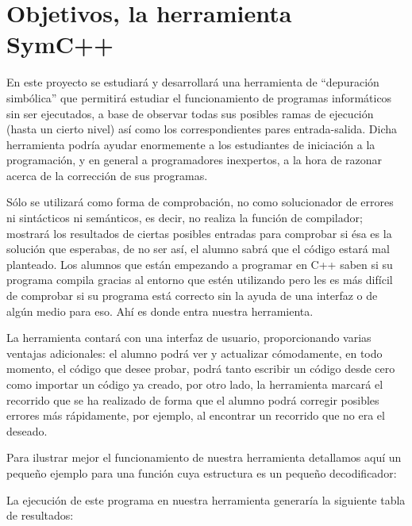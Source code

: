 \section{Objetivos, la herramienta SymC++}
\label{cap1:sec:objetivos}

En este proyecto se estudiar\'a y desarrollar\'a una herramienta de ``depuraci\'on simb\'olica'' que permitir\'a estudiar el funcionamiento de programas inform\'aticos sin ser ejecutados, a base de observar todas sus posibles ramas de ejecuci\'on (hasta un cierto nivel) as\'i como los correspondientes pares entrada-salida. Dicha herramienta podr\'ia ayudar enormemente a los estudiantes de iniciaci\'on a la programaci\'on, y en general a programadores inexpertos, a la hora de razonar acerca de la correcci\'on de sus programas.

S\'olo se utilizar\'a como forma de comprobaci\'on, no como solucionador de errores ni sint\'acticos ni sem\'anticos, es decir, no realiza la funci\'on de compilador; mostrar\'a los resultados de ciertas posibles entradas para comprobar si \'esa es la soluci\'on que esperabas, de no ser as\'i, el alumno sabr\'a que el c\'odigo estar\'a mal planteado. Los alumnos que est\'an empezando a programar en C++ saben si su programa compila gracias al entorno que est\'en utilizando pero les es m\'as dif\'icil de comprobar si su programa est\'a correcto sin la ayuda de una interfaz o de alg\'un medio para eso. Ah\'i es donde entra nuestra herramienta.

La herramienta contar\'a con una interfaz de usuario, proporcionando varias ventajas adicionales: el alumno podr\'a ver y actualizar c\'omodamente, en todo momento, el c\'odigo que desee probar, podr\'a tanto escribir un c\'odigo desde cero como importar un c\'odigo ya creado, por otro lado, la herramienta marcar\'a el recorrido que se ha realizado de forma que el alumno podr\'a corregir posibles errores m\'as r\'apidamente, por ejemplo, al encontrar un recorrido que no era el deseado.

Para ilustrar mejor el funcionamiento de nuestra herramienta detallamos aqu\'i un peque\~no ejemplo para una funci\'on cuya estructura es un peque\~no decodificador:



La ejecuci\'on de este programa en nuestra herramienta generar\'ia la siguiente tabla de resultados:

